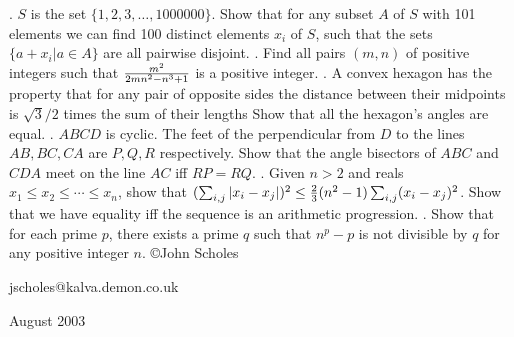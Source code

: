 \nopagenumbers
{}
\vskip 25pt
. $S$ is the set $\{1, 2, 3, \ldots , 1000000\}$. Show that for any subset $A$ of $S$ with 101 elements we can find 100 distinct elements $x_i$ of $S$, such that the sets $\{a+x_i | a \in A\}$ are all pairwise disjoint. 
\vskip 12pt
. Find all pairs $(m, n)$ of positive integers such that ${m^2 \over 2mn^2 - n^3 + 1}$ is a positive integer.
\vskip 12pt
. A convex hexagon has the property that for any pair of opposite sides the distance between their midpoints is $\sqrt{3}/2$ times the sum of their lengths Show that all the hexagon\rq s angles are equal.
\vskip 12pt
. $ABCD$ is cyclic. The feet of the perpendicular from $D$ to the lines $AB, BC, CA$ are $P, Q, R$ respectively. Show that the angle bisectors of $ABC$ and $CDA$ meet on the line $AC$ iff $RP = RQ$.
\vskip 12pt
. Given $n > 2$ and reals $x_1 \le x_2 \le \cdots \le x_n$, show that $(\sum_{i,j} |x_i - x_j|)^2 \le {2 \over 3}(n^2 - 1) \sum_{i,j} (x_i - x_j)^2$. Show that we have equality iff the sequence is an arithmetic progression.
\vskip 12pt
. Show that for each prime $p$, there exists a prime $q$ such that $n^p - p$ is not divisible by $q$ for any positive integer $n$.
\vskip 20pt
\noindent \copyright John Scholes

\noindent jscholes@kalva.demon.co.uk

 August 2003

\bye

